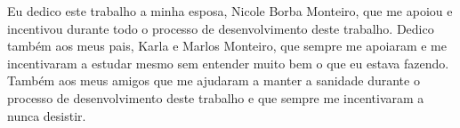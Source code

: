Eu dedico este trabalho a minha esposa, Nicole Borba Monteiro, que me apoiou e incentivou durante todo o processo de desenvolvimento deste trabalho.
Dedico também aos meus pais, Karla e Marlos Monteiro, que sempre me apoiaram e me incentivaram a estudar mesmo sem entender muito bem o que eu estava fazendo.
Também aos meus amigos que me ajudaram a manter a sanidade durante o processo de desenvolvimento deste trabalho e que sempre me incentivaram a nunca desistir.